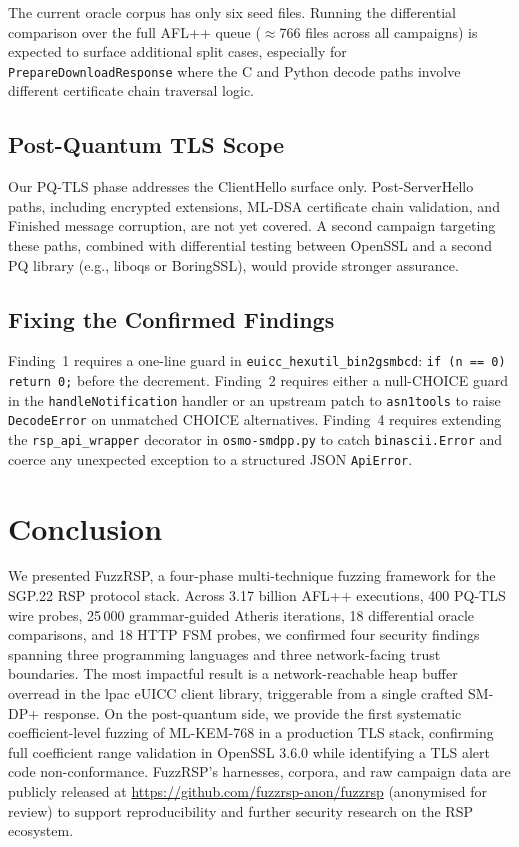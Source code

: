 \documentclass[final,3p,times,twocolumn]{elsarticle}
\begin{document}
The current oracle corpus has only six seed files.
Running the differential comparison over the full AFL++ queue
($\approx$766 files across all campaigns) is expected to surface additional
split cases, especially for \texttt{PrepareDownloadResponse} where the C
and Python decode paths involve different certificate chain traversal logic.

\subsection{Post-Quantum TLS Scope}

Our PQ-TLS phase addresses the ClientHello surface only.
Post-ServerHello paths, including encrypted extensions, ML-DSA certificate chain
validation, and Finished message corruption, are not yet covered.
A second campaign targeting these paths, combined with differential testing
between OpenSSL and a second PQ library (e.g., liboqs or BoringSSL), would
provide stronger assurance.

\subsection{Fixing the Confirmed Findings}

Finding~1 requires a one-line guard in \texttt{euicc\_hexutil\_bin2gsmbcd}:
\texttt{if (n == 0) return 0;} before the decrement.
Finding~2 requires either a null-CHOICE guard in the \texttt{handleNotification}
handler or an upstream patch to \texttt{asn1tools} to raise
\texttt{DecodeError} on unmatched CHOICE alternatives.
Finding~4 requires extending the \texttt{rsp\_api\_wrapper} decorator in
\texttt{osmo-smdpp.py} to catch \texttt{binascii.Error} and coerce any
unexpected exception to a structured JSON \texttt{ApiError}.

\section{Conclusion}\label{sec:conclusion}

We presented FuzzRSP, a four-phase multi-technique fuzzing framework for the
SGP.22 RSP protocol stack.
Across 3.17 billion AFL++ executions, 400 PQ-TLS wire probes, 25\,000
grammar-guided Atheris iterations, 18 differential oracle comparisons, and
18 HTTP FSM probes, we confirmed four security findings spanning three
programming languages and three network-facing trust boundaries.
The most impactful result is a network-reachable heap buffer overread in
the lpac eUICC client library, triggerable from a single crafted SM-DP+
response.
On the post-quantum side, we provide the first systematic coefficient-level
fuzzing of ML-KEM-768 in a production TLS stack, confirming full coefficient
range validation in OpenSSL 3.6.0 while identifying a TLS alert code
non-conformance.
FuzzRSP's harnesses, corpora, and raw campaign data are publicly released
at \url{https://github.com/fuzzrsp-anon/fuzzrsp} (anonymised for review)
to support reproducibility and further security research on the RSP ecosystem.
\end{document}
